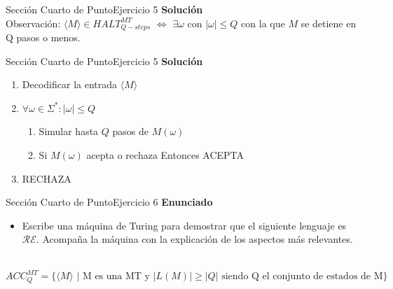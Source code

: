 \documentclass[10pt, envcountsect, presentation, aspectratio=169]{beamer}
\newcommand{\lr}{\ensuremath{\mathcal {RE}}}
\begin{document}

\begin{frame}{Sección Cuarto de Punto}{Ejercicio 5}
    \textbf{Solución}\\
    Observación: $\langle M \rangle \in HALT_{Q-steps}^{MT}$ $\Leftrightarrow$ $\exists \omega \text{ con } | \omega | \leq Q$ con la que $M$ se detiene en Q pasos o menos.\\
\end{frame}


\begin{frame}{Sección Cuarto de Punto}{Ejercicio 5}
    \textbf{Solución}\\
    \begin{enumerate}
        \item Decodificar la entrada $\langle M \rangle$
        \item $\forall \omega \in \Sigma^* : |\omega| \leq Q$
        \begin{enumerate}
            \item Simular hasta $Q$ pasos de $M(\omega)$
            \item Si $M(\omega)$ acepta o rechaza Entonces ACEPTA
        \end{enumerate}
        \item RECHAZA
    \end{enumerate}
\end{frame}


\begin{frame}{Sección Cuarto de Punto}{Ejercicio 6}
\textbf{Enunciado}
	\begin{itemize}
        \item Escribe una máquina de Turing para demostrar que el siguiente lenguaje es $\lr$. Acompaña la máquina con la explicación de los aspectos más relevantes.\\~\\
    \end{itemize}
    $$ACC_{Q}^{MT}=\{\langle M \rangle \mbox{ | M es una MT y } |L(M)| \geq |Q| \mbox{ siendo Q el conjunto de estados de M}\}$$
\end{frame}

\end{document}
